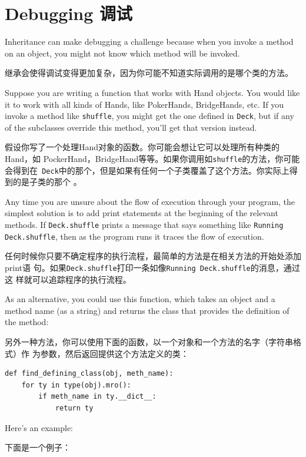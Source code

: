 \documentclass[10pt]{book}
\begin{document}
\begin{CJK}{UTF8}{gbsn}
\begin{exercise}
\end{exercise}


\section{Debugging 调试}

Inheritance can make debugging a challenge because when you
invoke a method on an object, you might not know which method
will be invoked.

继承会使得调试变得更加复杂，因为你可能不知道实际调用的是哪个类的方法。

Suppose you are writing a function that works with Hand objects.
You would like it to work with all kinds of Hands, like
PokerHands, BridgeHands, etc.  If you invoke a method like
{\tt shuffle}, you might get the one defined in {\tt Deck},
but if any of the subclasses override this method, you'll
get that version instead.  

假设你写了一个处理Hand对象的函数。你可能会想让它可以处理所有种类的Hand，如
PockerHand，BridgeHand等等。如果你调用如{\tt shuffle}的方法，你可能会得到在{\tt
Deck}中的那个，但是如果有任何一个子类覆盖了这个方法。你实际上得到的是子类的那个
。

Any time you are unsure about the flow of execution through your
program, the simplest solution is to add print statements at the
beginning of the relevant methods.  If {\tt Deck.shuffle} prints a
message that says something like {\tt Running Deck.shuffle}, then as
the program runs it traces the flow of execution.

任何时候你只要不确定程序的执行流程，最简单的方法是在相关方法的开始处添加print语
句。如果{\tt Deck.shuffle}打印一条如像{\tt Running Deck.shuffle}的消息，通过这
样就可以追踪程序的执行流程。

As an alternative, you could use this function, which takes an
object and a method name (as a string) and returns the class that
provides the definition of the method:

另外一种方法，你可以使用下面的函数，以一个对象和一个方法的名字（字符串格式）作
为参数，然后返回提供这个方法定义的类：

\begin{verbatim}
def find_defining_class(obj, meth_name):
    for ty in type(obj).mro():
        if meth_name in ty.__dict__:
            return ty
\end{verbatim}
%
Here's an example:

下面是一个例子：


\end{CJK}
\end{document}
